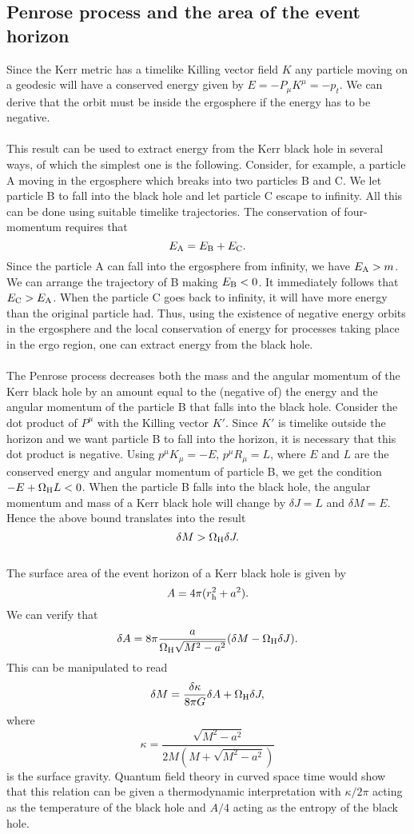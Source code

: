 \subsection{Penrose process and the area of the event horizon}
Since the Kerr metric has a timelike Killing vector field $K$ any particle moving on a geodesic will have a conserved energy given by $E = -P_{\mu} K^{\mu} = -p_{t}$.
We can derive that the orbit must be inside the ergosphere if the energy has to be negative.
\\ \\
This result can be used to extract energy from the Kerr black hole in several ways, of which the simplest one is the following. 
Consider, for example, a particle A moving in the ergosphere which breaks into two particles B and C. 
We let particle B to fall into the black hole and let particle C escape to infinity. 
All this can be done using suitable timelike trajectories. The conservation of four-momentum requires that
\[E_{\rm A} = E_{\rm B} + E_{\rm C}.\]
Since the particle A can fall into the ergosphere from infinity, we have $E_{\rm A} > m$.
We can arrange the trajectory of B making $E_{\rm B} < 0$. It immediately follows that $E_{\rm C} > E_{\rm A}$. 
When the particle C goes back to infinity, it will have more energy than the original particle had. 
Thus, using the existence of negative energy orbits in the ergosphere and the local conservation of energy for processes taking place in the ergo region, one can extract energy from the black hole.
\\ \\
The Penrose process decreases both the mass and the angular momentum of the Kerr black hole by an amount equal to the (negative of) the energy and the angular momentum of the particle B that falls into the black hole. 
Consider the dot product of $P^{\mu}$ with the Killing vector $K'$. 
Since $K'$ is timelike outside the horizon and we want particle B to fall into the horizon, it is necessary that this dot product is negative. 
Using $p^{\mu}K_{\mu} = -E$, $p^{\mu}R_{\mu} = L$,
where $E$ and $L$ are the conserved energy and angular momentum of particle B, we get the condition $-E + \Omega_{\rm H} L < 0$. 
When the particle B falls into the black hole, the angular momentum and mass of a Kerr black hole will change by $\delta J = L$ and $\delta M = E$. Hence the above bound
translates into the result
\[\delta M > \Omega_{\rm H} \delta J.\]
\\
The surface area of the event horizon of a Kerr black hole is given by
\[A = 4\pi (r_{\rm h}^2 + a^2).\]
We can verify that
\[\delta A = 8\pi \frac{a}{\Omega_{\rm H}\sqrt{M^2-a^2}}(\delta M - \Omega_{\rm H} \delta J).\]
This can be manipulated to read
\[\delta M = \frac{\delta \kappa}{8\pi G} \delta A + \Omega_{\rm H}\delta J,\]
where
\[\kappa = \frac{\sqrt{M^2-a^2}}{2M(M+\sqrt{M^2-a^2})}\]
is the surface gravity. 
Quantum field theory in curved space time would show that this relation can be given a thermodynamic interpretation with $\kappa / 2\pi$ acting as the temperature of the black hole and $A/4$ acting as the entropy of the black hole.

